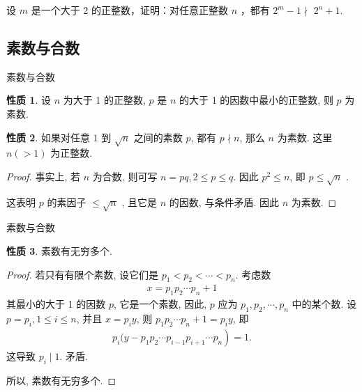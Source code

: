 \documentclass[aspectratio=169]{ctexbeamer}
\theoremstyle{definition}
\newtheorem{property}{性质}[section]
\begin{document}
\begin{frame}[t]
	\begin{example}
		设 $m$ 是一个大于 2 的正整数，证明：对任意正整数 $n$ ，都有 $2^{m}-1 \nmid$ $2^{n}+1$.
	\end{example}
\end{frame}

\subsection{素数与合数}
\begin{frame}{素数与合数}
	\begin{property}
		设 $n$ 为大于 1 的正整数, $p$ 是 $n$ 的大于 1 的因数中最小的正整数, 则 $p$ 为素数.
	\end{property}
	\pause
	\begin{property}
		如果对任意 $1$ 到 $\sqrt{n}$ 之间的素数 $p$, 都有 $p \nmid n$, 那么 $n$ 为素数. 这里 $n(>1)$ 为正整数.
	\end{property}
	\pause
	\begin{proof}
		事实上, 若 $n$ 为合数, 则可写 $n=p q, 2 \leqslant p \leqslant q$. 因此 $p^{2} \leqslant n$, 即 $p \leqslant \sqrt{n}$ .

		这表明 $p$ 的素因子 $\leqslant \sqrt{n}$ , 且它是 $n$ 的因数, 与条件矛盾. 因此 $n$ 为素数.
	\end{proof}
\end{frame}

\begin{frame}{素数与合数}
	\begin{property}
		素数有无穷多个.
	\end{property}
	\pause
	\begin{proof}
		若只有有限个素数, 设它们是 $p_{1}<p_{2}<\cdots<p_{n}$. 考虑数
		\begin{align*}
			x=p_{1} p_{2} \cdots p_{n}+1
		\end{align*}
		其最小的大于 1 的因数 $p$, 它是一个素数, 因此, $p$ 应为 $p_{1}, p_{2}, \cdots, p_{n}$ 中的某个数. 设 $p=p_{i}, 1 \leqslant i \leqslant n$, 并且 $x=p_{i} y$, 则 $p_{1} p_{2} \cdots p_{n}+1=p_{i} y$, 即
		\begin{align*}
			p_{i}(y-\left.p_{1} p_{2} \cdots p_{i-1} p_{i+1} \cdots p_{n}\right)=1.
		\end{align*}
		这导致 $p_{i} \mid 1$. 矛盾.

		所以, 素数有无穷多个.
	\end{proof}
\end{frame}
\end{document}
